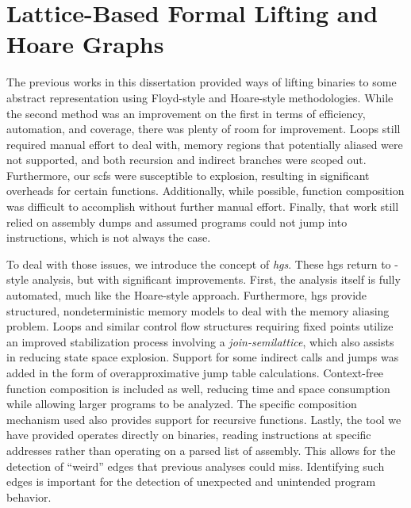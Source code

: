 \chapter{Lattice-Based Formal Lifting and Hoare Graphs}\label{ch:hg-lifting}
The previous works in this dissertation provided ways of lifting binaries to some abstract representation using Floyd-style and Hoare-style methodologies.
While the second method was an improvement on the first in terms of efficiency, automation, and coverage, there was plenty of room for improvement.
Loops still required manual effort to deal with, memory regions that potentially aliased were not supported, and both recursion and indirect branches were scoped out.
Furthermore, our \acp{scf} were susceptible to explosion, resulting in significant overheads for certain functions.
Additionally, while possible, function composition was difficult to accomplish without further manual effort.
Finally, that work still relied on assembly dumps and assumed programs could not jump into instructions, which is not always the case.

To deal with those issues, we introduce the concept of \emph{\acp{hg}}.
These \acp{hg} return to -style analysis, but with significant improvements.
First, the analysis itself is fully automated, much like the Hoare-style approach.
Furthermore, \acp{hg} provide structured, nondeterministic memory models to deal with the memory aliasing problem.
Loops and similar control flow structures requiring fixed points utilize an improved stabilization process involving a \emph{join-semilattice}, which also assists in reducing state space explosion.
Support for some indirect calls and jumps was added in the form of overapproximative jump table calculations.
Context-free function composition is included as well, reducing time and space consumption while allowing larger programs to be analyzed.
The specific composition mechanism used also provides support for recursive functions.
Lastly, the tool we have provided operates directly on binaries, reading instructions at specific addresses rather than operating on a parsed list of assembly.
This allows for the detection of ``weird'' edges  \autocite{shapiro2013weird,dullien2017weird} that previous analyses could miss.
Identifying such edges is important for the detection of unexpected and unintended program behavior.

